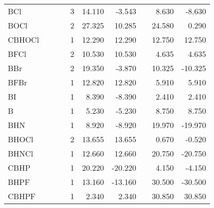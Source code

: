 \begin{table}
\begin{center}
\begin{tabular}{lrrrrrrrrr}
  BCl       &     &          &          &   3 &   14.110 &   -3.543 &     &    8.630 &   -8.630 \\
  BOCl      &     &          &          &   2 &   27.325 &   10.285 &     &   24.580 &    0.290 \\
  CBHOCl    &     &          &          &   1 &   12.290 &   12.290 &     &   12.750 &   12.750 \\
  BFCl      &     &          &          &   2 &   10.530 &   10.530 &     &    4.635 &    4.635 \\
  BBr       &     &          &          &   2 &   19.350 &   -3.870 &     &   10.325 &  -10.325 \\
  BFBr      &     &          &          &   1 &   12.820 &   12.820 &     &    5.910 &    5.910 \\
  BI        &     &          &          &   1 &    8.390 &   -8.390 &     &    2.410 &    2.410 \\
  B         &     &          &          &   1 &    5.230 &   -5.230 &     &    8.750 &    8.750 \\
  BHN       &     &          &          &   1 &    8.920 &   -8.920 &     &   19.970 &  -19.970 \\
  BHOCl     &     &          &          &   2 &   13.655 &   13.655 &     &    0.670 &   -0.520 \\
  BHNCl     &     &          &          &   1 &   12.660 &   12.660 &     &   20.750 &  -20.750 \\
  CBHP      &     &          &          &   1 &   20.220 &  -20.220 &     &    4.150 &   -4.150 \\
  BHPF      &     &          &          &   1 &   13.160 &  -13.160 &     &   30.500 &  -30.500 \\
  CBHPF     &     &          &          &   1 &    2.340 &    2.340 &     &   30.850 &   30.850 \\
\hline
\end{tabular}
\end{center}
\end{table}
